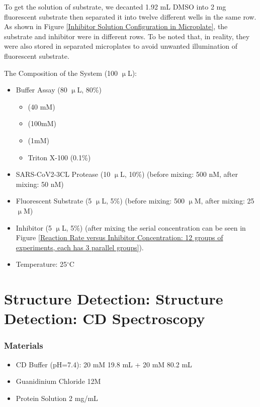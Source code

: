 \documentclass{report}
\begin{document}
To get the solution of substrate, we decanted 1.92 mL DMSO into 2 mg fluorescent substrate then separated it into twelve different wells in the same row.
As shown in Figure \ref{Inhibitor Solution Configuration in Microplate}, the substrate and inhibitor were in different rows.
To be noted that, in reality, they were also stored in separated microplates to avoid unwanted illumination of fluorescent substrate.

The Composition of the System (100 $\upmu$L):
\begin{itemize}
    \item Buffer Assay (80 $\upmu$L, 80\%)
    \begin{itemize}
        \item {} (40 mM)
        \item {} (100mM)
        \item {} (1mM)
        \item Triton X-100 (0.1\%)
    \end{itemize}
    \item SARS-CoV2-3CL Protease (10 $\upmu$L, 10\%) (before mixing: 500 nM, after mixing: 50 nM)
    \item Fluorescent Substrate (5 $\upmu$L, 5\%) (before mixing: 500 $\upmu$M, after mixing: 25 $\upmu$M)
    \item Inhibitor (5 $\upmu$L, 5\%) (after mixing the serial concentration can be seen in Figure \ref{Reaction Rate versus Inhibitor Concentration: 12 groups of experiments, each has 3 parallel groups}).
    \item Temperature: 25$^\circ$C
\end{itemize}

\section{Structure Detection: Structure Detection: CD Spectroscopy}
\subsubsection{Materials}
\begin{itemize}
    \item CD Buffer (pH=7.4):  20 mM 19.8 mL +  20 mM 80.2 mL
    \item Guanidinium Chloride 12M
    \item Protein Solution 2 mg/mL 
\end{itemize}
\end{document}
